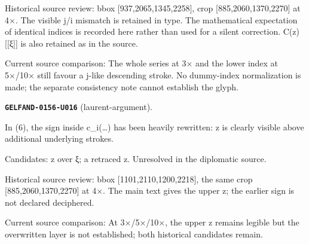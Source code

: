 Historical source review: bbox [937,2065,1345,2258], crop [885,2060,1370,2270] at 4×. The visible j/i mismatch is retained in type. The mathematical expectation of identical indices is recorded here rather than used for a silent correction. C(z)[[ξ]] is also retained as in the source.\par
Current source comparison: The whole series at 3× and the lower index at 5×/10× still favour a j-like descending stroke. No dummy-index normalization is made; the separate consistency note cannot establish the glyph.\par\medskip
\par\noindent\leavevmode{}\label{GELFAND-0156-U016}\label{GELFAND-P001440:laurent-argument}\textbf{\texttt{GELFAND-0156-U016}} (laurent-argument).\nopagebreak[4]\par
In (6), the sign inside c\_i(…) has been heavily rewritten: z is clearly visible above additional underlying strokes.\par
Candidates: z over ξ; a retraced z. Unresolved in the diplomatic source.\par
Historical source review: bbox [1101,2110,1200,2218], the same crop [885,2060,1370,2270] at 4×. The main text gives the upper z; the earlier sign is not declared deciphered.\par
Current source comparison: At 3×/5×/10×, the upper z remains legible but the overwritten layer is not established; both historical candidates remain.\par\medskip

